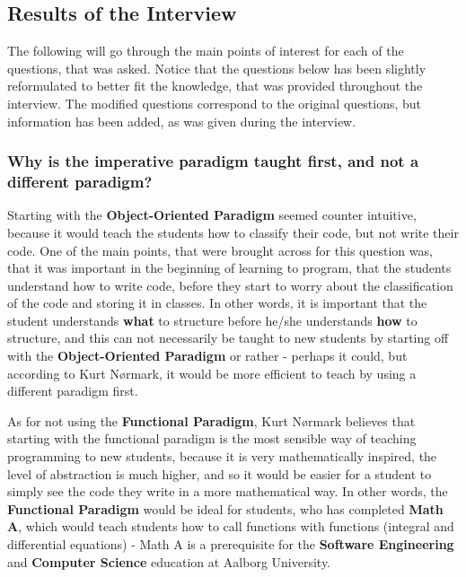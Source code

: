 \subsection{Results of the Interview}
The following will go through the main points of interest for each of the questions, that was asked.
Notice that the questions below has been slightly reformulated to better fit the knowledge, that was provided throughout the interview.
The modified questions correspond to the original questions, but information has been added, as was given during the interview.

\subsubsection{Why is the imperative paradigm taught first, and not a different paradigm?}

Starting with the \textbf{Object-Oriented Paradigm} seemed counter intuitive, because it would teach the students how to classify their code, but not write their code.
One of the main points, that were brought across for this question was, that it was important in the beginning of learning to program, that the students understand how to write code, before they start to worry about the classification of the code and storing it in classes.
In other words, it is important 
that the student understands \textbf{what} to structure before he/she understands \textbf{how} to structure, and this can not necessarily be taught to new students by starting off with the \textbf{Object-Oriented Paradigm} or rather - perhaps it could, but according to Kurt N{\o}rmark, it would be more efficient to teach by using a different paradigm first.\newline

As for not using the \textbf{Functional Paradigm}, Kurt N{\o}rmark believes that starting with the functional paradigm is the most sensible way of teaching programming to new students, because it is very mathematically inspired, the level of abstraction is much higher, and so it would be easier for a student to simply see the code they write in a more mathematical way.
In other words, the \textbf{Functional Paradigm} would be ideal for students, who has completed \textbf{Math A}, which would teach students how to call functions with functions (integral and differential equations)
 - Math A is a prerequisite for the \textbf{Software Engineering} and \textbf{Computer Science} education at Aalborg University.\cite{UG}\newline

